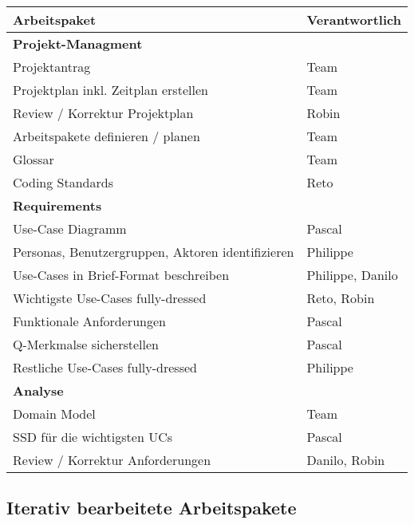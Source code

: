 \documentclass[a4paper,12pt,halfparskip,DIV14]{scrartcl}
\begin{document}
\begin{tabular}{@{} l l @{}}
\toprule
Arbeitspaket & Verantwortlich \\
\midrule
\textbf{Projekt-Managment} & \\
Projektantrag & Team \\
Projektplan inkl. Zeitplan erstellen & Team \\
Review / Korrektur Projektplan & Robin \\
Arbeitspakete definieren / planen & Team \\
Glossar & Team \\
Coding Standards & Reto \\
\midrule
\textbf{Requirements} &  \\
Use-Case Diagramm & Pascal \\
Personas, Benutzergruppen, Aktoren identifizieren & Philippe \\
Use-Cases in Brief-Format beschreiben & Philippe, Danilo \\
Wichtigste Use-Cases fully-dressed & Reto, Robin \\
Funktionale Anforderungen & Pascal \\
Q-Merkmalse sicherstellen & Pascal \\
Restliche Use-Cases fully-dressed & Philippe \\
\midrule
\textbf{Analyse} &  \\
Domain Model & Team \\
SSD für die wichtigsten UCs & Pascal \\
Review / Korrektur Anforderungen & Danilo, Robin \\
\bottomrule
\end{tabular}

\subsection{Iterativ bearbeitete Arbeitspakete}
\end{document}
